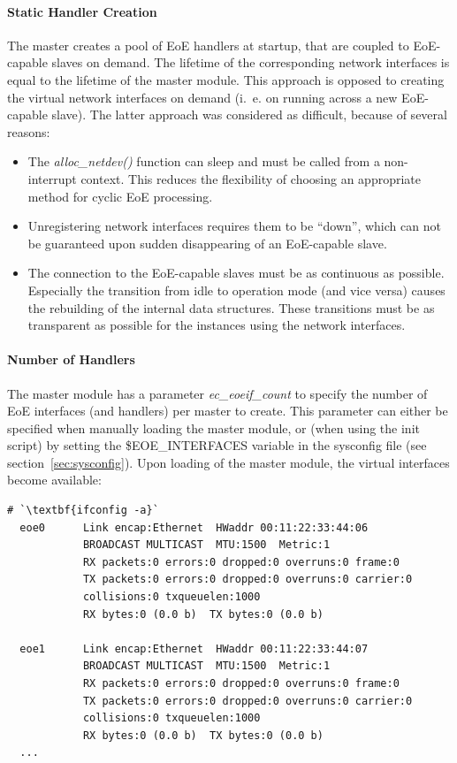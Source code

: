 \documentclass[a4paper,12pt,BCOR6mm,bibtotoc,idxtotoc]{scrbook}
\begin{document}
\paragraph{Static Handler Creation}

The master creates a pool of EoE handlers at startup, that are coupled
to EoE-capable slaves on demand. The lifetime of the corresponding
network interfaces is equal to the lifetime of the master module.
This approach is opposed to creating the virtual network interfaces on
demand (i.~e. on running across a new EoE-capable slave). The latter
approach was considered as difficult, because of several reasons:

\begin{itemize}
\item The \textit{alloc\_netdev()} function can sleep and must be
  called from a non-interrupt context. This reduces the flexibility of
  choosing an appropriate method for cyclic EoE processing.
\item Unregistering network interfaces requires them to be ``down'',
  which can not be guaranteed upon sudden disappearing of an
  EoE-capable slave.
\item The connection to the EoE-capable slaves must be as continuous
  as possible. Especially the transition from idle to operation mode
  (and vice versa) causes the rebuilding of the internal data
  structures. These transitions must be as transparent as possible for
  the instances using the network interfaces.
\end{itemize}

\paragraph{Number of Handlers} %

The master module has a parameter \textit{ec\_eoeif\_count} to specify
the number of EoE interfaces (and handlers) per master to create. This
parameter can either be specified when manually loading the master
module, or (when using the init script) by setting the
\$EOE\_INTERFACES variable in the sysconfig file (see
section~\ref{sec:sysconfig}). Upon loading of the master module, the
virtual interfaces become available:

\begin{lstlisting}[gobble=2]
  # `\textbf{ifconfig -a}`
  eoe0      Link encap:Ethernet  HWaddr 00:11:22:33:44:06
            BROADCAST MULTICAST  MTU:1500  Metric:1
            RX packets:0 errors:0 dropped:0 overruns:0 frame:0
            TX packets:0 errors:0 dropped:0 overruns:0 carrier:0
            collisions:0 txqueuelen:1000
            RX bytes:0 (0.0 b)  TX bytes:0 (0.0 b)

  eoe1      Link encap:Ethernet  HWaddr 00:11:22:33:44:07
            BROADCAST MULTICAST  MTU:1500  Metric:1
            RX packets:0 errors:0 dropped:0 overruns:0 frame:0
            TX packets:0 errors:0 dropped:0 overruns:0 carrier:0
            collisions:0 txqueuelen:1000
            RX bytes:0 (0.0 b)  TX bytes:0 (0.0 b)
  ...
\end{lstlisting}
\end{document}
